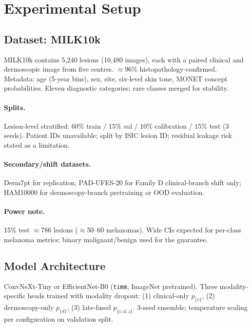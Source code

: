 \documentclass[conference]{IEEEtran}
\newcommand{\1}{\mathbf{1}}
\begin{document}
\section{Experimental Setup}
\label{sec:experiments}

\subsection{Dataset: MILK10k}

MILK10k \cite{tschandl2024milk10k} contains 5,240 lesions (10,480 images),
each with a paired clinical and dermoscopic image from five centres.
$\approx$96\% histopathology-confirmed. Metadata: age (5-year bins), sex,
site, six-level skin tone, MONET concept probabilities. Eleven diagnostic
categories; rare classes merged for stability.

\paragraph{Splits.} Lesion-level stratified:
$60\%$ train / $15\%$ val / $10\%$ calibration / $15\%$ test (3 seeds).
Patient IDs unavailable; split by ISIC lesion ID; residual leakage
risk stated as a limitation.

\paragraph{Secondary/shift datasets.} Derm7pt \cite{kawahara2019derm7pt}
for replication; PAD-UFES-20 \cite{pacheco2020padufes} for Family D
clinical-branch shift only; HAM10000 \cite{tschandl2018ham10000} for
dermoscopy-branch pretraining or OOD evaluation.

\paragraph{Power note.}
15\% test $\approx$786 lesions ($\approx$50--60 melanomas). Wide CIs
expected for per-class melanoma metrics; binary malignant/benign used
for the guarantee.

\subsection{Model Architecture}

ConvNeXt-Tiny or EfficientNet-B0 (\texttt{timm}, ImageNet pretrained).
Three modality-specific heads trained with modality dropout:
(1) clinical-only $p_{\{c\}}$,
(2) dermoscopy-only $p_{\{d\}}$,
(3) late-fused $p_{\{c,d,z\}}$.
3-seed ensemble; temperature scaling per configuration on validation split.
\end{document}
